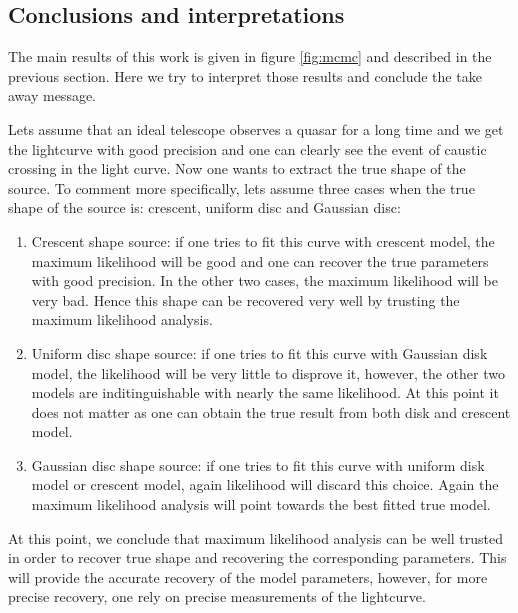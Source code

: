 \subsection{Conclusions and interpretations}
The main results of this work is given in figure \ref{fig:mcmc} and described in the previous section. Here we try to interpret those results and conclude the take away message.

Lets assume that an ideal telescope observes a quasar for a long time and we get the lightcurve with good precision and one can clearly see the event of caustic crossing in the light curve. Now one wants to extract the true shape of the source. To comment more specifically, lets assume three cases when the true shape of the source is: crescent, uniform disc and Gaussian disc:

\begin{enumerate}

\item Crescent shape source: if one tries to fit this curve with crescent model, the maximum likelihood will be good and one can recover the true parameters with good precision. In the other two cases, the maximum likelihood will be very bad. Hence this shape can be recovered very well by trusting the maximum likelihood analysis.
\item Uniform disc shape source: if one tries to fit this curve with Gaussian disk model, the likelihood will be very little to disprove it, however, the other two models are inditinguishable with nearly the same likelihood. At this point it does not matter as one can obtain the true result from both disk and crescent model.
\item Gaussian disc shape source: if one tries to fit this curve with uniform disk model or crescent model, again likelihood will discard this choice. Again the maximum likelihood analysis will point towards the best fitted true model.
\end{enumerate}

At this point, we conclude that maximum likelihood analysis can be well trusted in order to recover true shape and recovering the corresponding parameters. This will provide the accurate recovery of the model parameters, however, for more precise recovery, one rely on precise measurements of the lightcurve.

 
